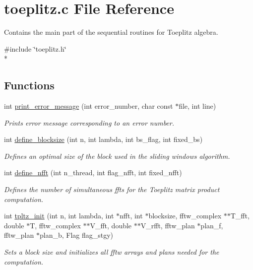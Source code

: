 \section{toeplitz.\-c File Reference}
\label{toeplitz_8c}


Contains the main part of the sequential routines for Toeplitz algebra.  


{\ttfamily \#include \char`\"{}toeplitz.\-h\char`\"{}}\\*
\subsection*{Functions}
\begin{DoxyCompactItemize}
\item 
int \hyperlink{toeplitz_8c_a24331a8efb6e0b77df7c645ef45b2830}{print\-\_\-error\-\_\-message} (int error\-\_\-number, char const $\ast$file, int line)
\begin{DoxyCompactList}\small\item\em Prints error message corresponding to an error number. \end{DoxyCompactList}\item 
int \hyperlink{toeplitz_8c_a186fc8d8825da293e94de77b77d01fba}{define\-\_\-blocksize} (int n, int lambda, int bs\-\_\-flag, int fixed\-\_\-bs)
\begin{DoxyCompactList}\small\item\em Defines an optimal size of the block used in the sliding windows algorithm. \end{DoxyCompactList}\item 
int \hyperlink{toeplitz_8c_a4c2846ca9f67faae5746325d1ec63aac}{define\-\_\-nfft} (int n\-\_\-thread, int flag\-\_\-nfft, int fixed\-\_\-nfft)
\begin{DoxyCompactList}\small\item\em Defines the number of simultaneous ffts for the Toeplitz matrix product computation. \end{DoxyCompactList}\item 
int \hyperlink{toeplitz_8c_a7f4e77d71f2c6f2caf652bab7520e3f4}{tpltz\-\_\-init} (int n, int lambda, int $\ast$nfft, int $\ast$blocksize, fftw\-\_\-complex $\ast$$\ast$T\-\_\-fft, double $\ast$T, fftw\-\_\-complex $\ast$$\ast$V\-\_\-fft, double $\ast$$\ast$V\-\_\-rfft, fftw\-\_\-plan $\ast$plan\-\_\-f, fftw\-\_\-plan $\ast$plan\-\_\-b, Flag flag\-\_\-stgy)
\begin{DoxyCompactList}\small\item\em Sets a block size and initializes all fftw arrays and plans needed for the computation. \end{DoxyCompactList}\item 
$$
\end{DoxyCompactItemize}
